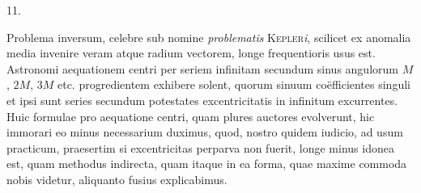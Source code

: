 \begin{center}
11.
\end{center}
Problema inversum, celebre sub nomine \emph{problematis} \textsc{Kepler}\emph{i}, scilicet ex anomalia media invenire veram atque radium vectorem, longe frequentioris usus est. Astronomi aequationem centri per seriem infinitam secundum sinus angulorum $M$, $2M$, $3M$ etc. progredientem exhibere solent, quorum sinuum coëfficientes singuli et ipsi sunt series secundum potestates excentricitatis in infinitum excurrentes. Huic formulae pro aequatione centri, quam plures auctores evolverunt, hic immorari eo minus necessarium duximus, quod, nostro quidem iudicio, ad usum practicum, praesertim si excentricitas perparva non fuerit, longe minus idonea est, quam methodus indirecta, quam itaque in ea forma, quae maxime commoda nobis videtur, aliquanto fusius explicabimus.

